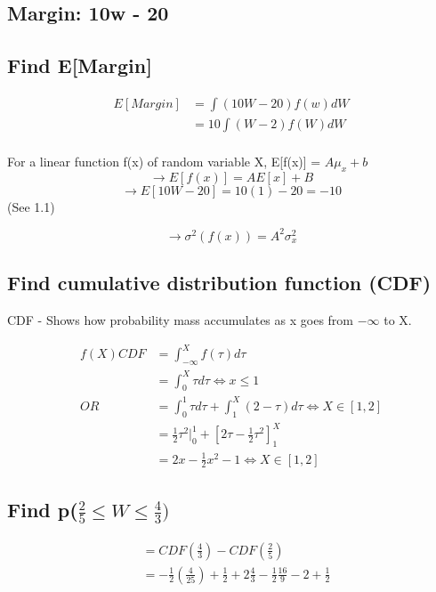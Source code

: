 \documentclass[]{article}
\begin{document}
	\subsection{Margin: 10w - 20}
	\subsection{Find E[Margin]}
	\begin{align*}
		E[Margin] &= \int(10W-20)f(w)dW \\
		&= 10\int(W-2)f(W)dW \\
	\end{align*}
	
	For a linear function f(x) of random variable X,
	E[f(x)] = $A\mu_x + b$ $$\to E[f(x)] = AE[x] + B$$
	$$\to E[10W - 20] = 10(1) - 20 = -10$$ (See 1.1)
	
	$$\to \sigma^2(f(x)) = A^2\sigma_x^2$$
	
	\pagebreak
	\subsection{Find cumulative distribution function (CDF)}
	CDF - Shows how probability mass accumulates as x goes from $-\infty$ to X.
	
	\begin{align*}
		f(X) CDF &= \int_{-\infty}^Xf(\tau)d\tau\\
		         &= \int_0^X\tau d\tau \iff x\leq 1 \\
		     OR\ &= \int_0^1\tau d\tau + \int_1^X (2-\tau )d\tau \iff X\in [1,2] \\
		         &= \frac{1}{2}\tau^2|_0^1 + [2\tau - \frac{1}{2}\tau^2]^X_1 \\
		         &= 2x - \frac{1}{2}x^2 - 1 \iff X\in [1,2]
	\end{align*}
	
	\subsection{Find p($\frac{2}{5}\leq W \leq \frac{4}{3})$}
	\begin{align*}
		&= CDF(\frac{4}{3}) - CDF(\frac{2}{5}) \\
		&= -\frac{1}{2}(\frac{4}{25}) + \frac{1}{2} + 2\frac{4}{3} - \frac{1}{2}\frac{16}{9} - 2 + \frac{1}{2} 
	\end{align*}
	
\end{document}
